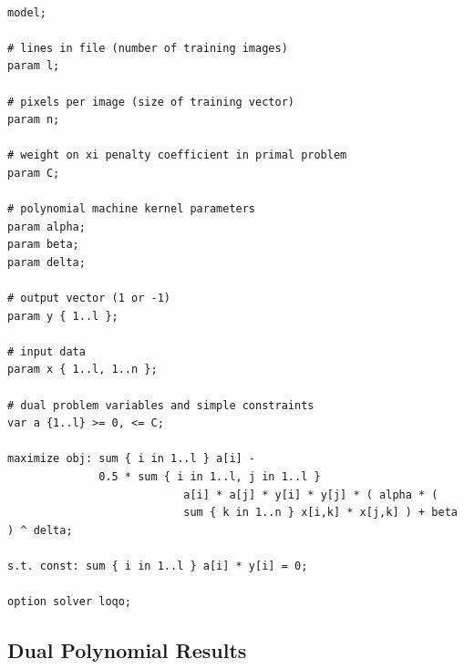 \documentclass{article}
\begin{document}
\begin{verbatim}

model;

# lines in file (number of training images)
param l;

# pixels per image (size of training vector)
param n;

# weight on xi penalty coefficient in primal problem
param C;

# polynomial machine kernel parameters
param alpha;
param beta;
param delta;

# output vector (1 or -1)
param y { 1..l };

# input data
param x { 1..l, 1..n };

# dual problem variables and simple constraints
var a {1..l} >= 0, <= C;

maximize obj: sum { i in 1..l } a[i] -
              0.5 * sum { i in 1..l, j in 1..l }
                           a[i] * a[j] * y[i] * y[j] * ( alpha * (
                           sum { k in 1..n } x[i,k] * x[j,k] ) + beta ) ^ delta;

s.t. const: sum { i in 1..l } a[i] * y[i] = 0;

option solver loqo;

\end{verbatim}

\subsection{Dual Polynomial Results}
\end{document}
